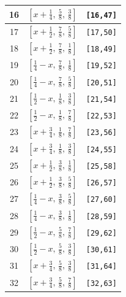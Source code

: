\documentclass[fleqn,8pt]{jsarticle}
\begin{document}
\begin{longtable}{ccc}
16 & $\left[ x + \frac{1}{4},\, \frac{5}{8},\, \frac{3}{8} \right]$ & {\tt [16,47]} \\ \hline
17 & $\left[ x + \frac{1}{2},\, \frac{7}{8},\, \frac{5}{8} \right]$ & {\tt [17,50]} \\ \hline
18 & $\left[ x + \frac{1}{2},\, \frac{7}{8},\, \frac{1}{8} \right]$ & {\tt [18,49]} \\ \hline
19 & $\left[ \frac{1}{4} - x,\, \frac{7}{8},\, \frac{1}{8} \right]$ & {\tt [19,52]} \\ \hline
20 & $\left[ \frac{1}{4} - x,\, \frac{7}{8},\, \frac{5}{8} \right]$ & {\tt [20,51]} \\ \hline
21 & $\left[ \frac{1}{2} - x,\, \frac{1}{8},\, \frac{3}{8} \right]$ & {\tt [21,54]} \\ \hline
22 & $\left[ \frac{1}{2} - x,\, \frac{1}{8},\, \frac{7}{8} \right]$ & {\tt [22,53]} \\ \hline
23 & $\left[ x + \frac{3}{4},\, \frac{1}{8},\, \frac{7}{8} \right]$ & {\tt [23,56]} \\ \hline
24 & $\left[ x + \frac{3}{4},\, \frac{1}{8},\, \frac{3}{8} \right]$ & {\tt [24,55]} \\ \hline
25 & $\left[ x + \frac{1}{2},\, \frac{3}{8},\, \frac{1}{8} \right]$ & {\tt [25,58]} \\ \hline
26 & $\left[ x + \frac{1}{2},\, \frac{3}{8},\, \frac{5}{8} \right]$ & {\tt [26,57]} \\ \hline
27 & $\left[ \frac{1}{4} - x,\, \frac{3}{8},\, \frac{5}{8} \right]$ & {\tt [27,60]} \\ \hline
28 & $\left[ \frac{1}{4} - x,\, \frac{3}{8},\, \frac{1}{8} \right]$ & {\tt [28,59]} \\ \hline
29 & $\left[ \frac{1}{2} - x,\, \frac{5}{8},\, \frac{7}{8} \right]$ & {\tt [29,62]} \\ \hline
30 & $\left[ \frac{1}{2} - x,\, \frac{5}{8},\, \frac{3}{8} \right]$ & {\tt [30,61]} \\ \hline
31 & $\left[ x + \frac{3}{4},\, \frac{5}{8},\, \frac{3}{8} \right]$ & {\tt [31,64]} \\ \hline
32 & $\left[ x + \frac{3}{4},\, \frac{5}{8},\, \frac{7}{8} \right]$ & {\tt [32,63]} \\
\end{longtable}
\renewcommand{\arraystretch}{1.2}
\end{document}
